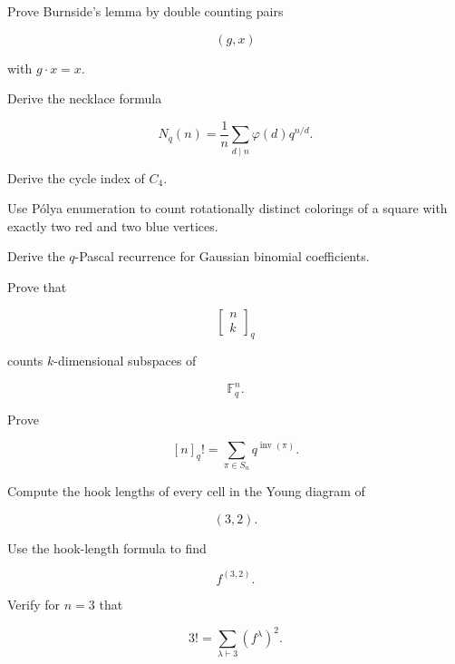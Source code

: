 \begin{exercise}[3]
Prove Burnside's lemma by double counting pairs

\[
(g,x)
\]

with \(g\cdot x=x\).
\end{exercise}

\begin{exercise}[3]
Derive the necklace formula

\[
N_q(n)
=
\frac1n
\sum_{d\mid n}
\varphi(d)q^{n/d}.
\]
\end{exercise}

\begin{exercise}[3]
Derive the cycle index of \(C_4\).
\end{exercise}

\begin{exercise}[3]
Use P\'olya enumeration to count rotationally distinct colorings of a
square with exactly two red and two blue vertices.
\end{exercise}

\begin{exercise}[3]
Derive the \(q\)-Pascal recurrence for Gaussian binomial coefficients.
\end{exercise}

\begin{exercise}[3]
Prove that

\[
\begin{bmatrix}
n\\
k
\end{bmatrix}_q
\]

counts \(k\)-dimensional subspaces of

\[
\mathbb{F}_q^n.
\]
\end{exercise}

\begin{exercise}[3]
Prove

\[
[n]_q!
=
\sum_{\pi\in S_n}
q^{\operatorname{inv}(\pi)}.
\]
\end{exercise}

\begin{exercise}[3]
Compute the hook lengths of every cell in the Young diagram of

\[
(3,2).
\]
\end{exercise}

\begin{exercise}[3]
Use the hook-length formula to find

\[
f^{(3,2)}.
\]
\end{exercise}

\begin{exercise}[3]
Verify for \(n=3\) that

\[
3!
=
\sum_{\lambda\vdash3}
(f^\lambda)^2.
\]
\end{exercise}

